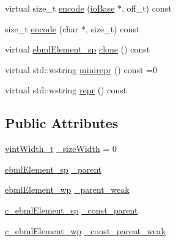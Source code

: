 \begin{DoxyCompactItemize}
\item 
virtual size\+\_\+t \mbox{\hyperlink{classebml_1_1ebmlElement_ad7db3756561ab4936492146597b1a0f2}{encode}} (\mbox{\hyperlink{classebml_1_1ioBase}{io\+Base}} $\ast$, off\+\_\+t) const
\item 
size\+\_\+t \mbox{\hyperlink{classebml_1_1ebmlElement_a90dcd3bd8e37160b21b9faed3cecd49c}{encode}} (char $\ast$, size\+\_\+t) const
\item 
virtual \mbox{\hyperlink{namespaceebml_adad533b7705a16bb360fe56380c5e7be}{ebml\+Element\+\_\+sp}} \mbox{\hyperlink{classebml_1_1ebmlElement_a94013f01b6f12c9c66864d44983dce47}{clone}} () const
\item 
virtual std\+::wstring \mbox{\hyperlink{classebml_1_1ebmlElement_a7852173aeef78bd843939ae5a82f1d1c}{minirepr}} () const =0
\item 
virtual std\+::wstring \mbox{\hyperlink{classebml_1_1ebmlElement_a77865a71f4bab782817ec82e88fb5198}{repr}} () const
\end{DoxyCompactItemize}
\subsection*{Public Attributes}
\begin{DoxyCompactItemize}
\item 
\mbox{\hyperlink{namespaceebml_a2ccdfb60b23efb51fe07f9d066e23604}{vint\+Width\+\_\+t}} \mbox{\hyperlink{classebml_1_1ebmlElement_a57c40a5bbd26c059e9f181d022ce9fe0}{\+\_\+size\+Width}} = 0
\item 
\mbox{\hyperlink{namespaceebml_adad533b7705a16bb360fe56380c5e7be}{ebml\+Element\+\_\+sp}} \mbox{\hyperlink{classebml_1_1ebmlElement_a5521124a98cbff8f29e61ecb7f265d6a}{\+\_\+parent}}
\item 
\mbox{\hyperlink{namespaceebml_a495fb58b42b0050d887415351af02935}{ebml\+Element\+\_\+wp}} \mbox{\hyperlink{classebml_1_1ebmlElement_ac4ae374c7897e4f8800ca6e0e1592bf9}{\+\_\+parent\+\_\+weak}}
\item 
\mbox{\hyperlink{namespaceebml_a2deef4e8071531b32e3533f1bf978917}{c\+\_\+ebml\+Element\+\_\+sp}} \mbox{\hyperlink{classebml_1_1ebmlElement_aad279b8a7e1b5613bc566be381a8a7bd}{\+\_\+const\+\_\+parent}}
\item 
\mbox{\hyperlink{namespaceebml_abc218c2fc1444b2fd8a8a5fae67e0151}{c\+\_\+ebml\+Element\+\_\+wp}} \mbox{\hyperlink{classebml_1_1ebmlElement_acadf2a9253bc91eb7d217a50499587cb}{\+\_\+const\+\_\+parent\+\_\+weak}}
\end{DoxyCompactItemize}
